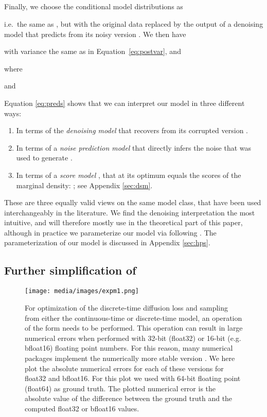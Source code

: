 \documentclass{article}
\def\Eqref#1{Equation~\ref{#1}}
\begin{document}
\subsection{}
Finally, we choose the conditional model distributions as

i.e.\ the same as , but with the original data  replaced by the output of a denoising model  that predicts  from its noisy version . We then have

with variance  the same as in \Eqref{eq:postvar}, and 

where

and




Equation \ref{eq:preds} shows that we can interpret our model in three different ways: 
\begin{enumerate}
\item In terms of the \emph{denoising model}  that recovers  from its corrupted version .
\item In terms of a \emph{noise prediction model}  that directly infers the noise  that was used to generate .
\item In terms of a \emph{score model} , that at its optimum equals the scores of the marginal density: ; see Appendix \ref{sec:dsm}.
\end{enumerate}
These are three equally valid views on the same model class, that have been used interchangeably in the literature. We find the denoising interpretation the most intuitive, and will therefore mostly use  in the theoretical part of this paper, although in practice we parameterize our model via  following \cite{ho2020denoising}. The parameterization of our model is discussed in Appendix \ref{sec:hps}.

\subsection{Further simplification of }
\label{sec:sampling}

\begin{figure}[t]
    \centering
    \texttt{[image: media/images/expm1.png]}
    \caption{For optimization of the discrete-time diffusion loss and sampling from either the continuous-time or discrete-time model, an operation of the form  needs to be performed. This operation can result in large numerical errors when performed with 32-bit (float32) or 16-bit (e.g. bfloat16) floating point numbers. For this reason, many numerical packages implement the numerically more stable version . We here plot the absolute numerical errors for each of these versions for float32 and bfloat16. For this plot we used  with 64-bit floating point (float64) as ground truth. The plotted numerical error is the absolute value of the difference between the ground truth and the computed float32 or bfloat16 values.}
    \label{fig:expm1}
\end{figure}
\end{document}
